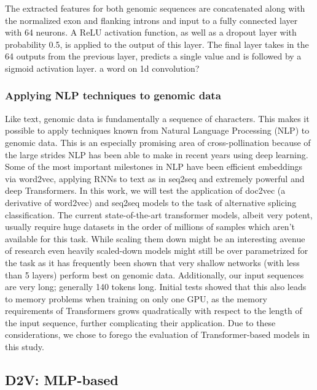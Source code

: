 The extracted features for both genomic sequences are concatenated along with the normalized exon and flanking introns and input to a fully connected layer with 64 neurons. A ReLU activation function, as well as a dropout layer with probability 0.5, is applied to the output of this layer. The final layer takes in the 64 outputs from the previous layer, predicts a single value and is followed by a sigmoid activation layer.
a word on 1d convolution?
\subsubsection{Applying NLP techniques to genomic data}
Like text, genomic data is fundamentally a sequence of characters.
This makes it possible to apply techniques known from Natural Language Processing (NLP) to genomic data. This is an especially promising area of cross-pollination because of the large strides NLP has been able to make in recent years using deep learning.
Some of the most important milestones in NLP have been efficient embeddings via word2vec, applying RNNs to text as in seq2seq and extremely powerful and deep Transformers.
In this work, we will test the application of doc2vec (a derivative of word2vec) and seq2seq models to the task of alternative splicing classification. The current state-of-the-art transformer models, albeit very potent, usually require huge datasets in the order of millions of samples which aren't available for this task. While scaling them down might be an interesting avenue of research even heavily scaled-down models might still be over parametrized for the task as it has frequently been shown that very shallow networks (with less than 5 layers) perform best on genomic data. Additionally, our input sequences are very long; generally 140 tokens long. Initial tests showed that this also leads to memory problems when training on only one GPU, as the memory requirements of Transformers grows quadratically with respect to the length of the input sequence, further complicating their application. Due to these considerations, we chose to forego the evaluation of Transformer-based models in this study.
\subsection{D2V: MLP-based} \label{subsec:d2v}

